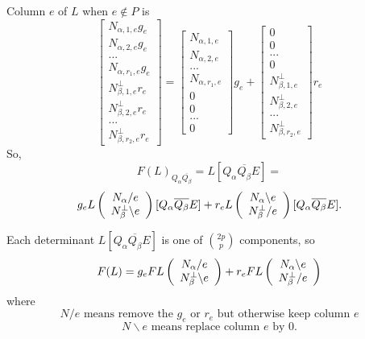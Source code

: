 \documentclass{beamer}
\begin{document}
\begin{frame}
  Column $e$ of $L$ when $e\not\in P$ is
\[
\left[\begin{array}{c}
    N_{\alpha,1,e}g_e\\
    N_{\alpha,2,e}g_e\\
    ...\\
    N_{\alpha,r_1,e}g_e\\
    N_{\beta,1,e}^\perp r_e\\
    N_{\beta,2,e}^\perp r_e\\
    ...\\
    N_{\beta,r_2,e}^\perp r_e
  \end{array}\right]
=
\left[\begin{array}{c}
    N_{\alpha,1,e}\\
    N_{\alpha,2,e}\\
    ...\\
    N_{\alpha,r_1,e}\\
    0\\
    0\\
    ...\\
    0
  \end{array}\right]g_e
+
\left[\begin{array}{c}
    0\\
    0\\
    ...\\
    0\\
    N_{\beta,1,e}^\perp \\
    N_{\beta,2,e}^\perp\\
    ...\\
    N_{\beta,r_2,e}^\perp
  \end{array}\right]r_e
\]
So, 
\[
F(L)_{Q_\alpha \overline{Q_\beta} } = L[Q_\alpha \overline{Q_\beta} E ] =
\]
\[
g_eL\left(\begin{array}{c} N_{\alpha}/e\\ N_{\beta}^{\perp}\backslash e \end{array} \right)[Q_\alpha \overline{Q_\beta} E]
+
r_eL\left(\begin{array}{c} N_{\alpha}\backslash e\\ N_{\beta}^{\perp}/e \end{array} \right)[Q_\alpha \overline{Q_\beta} E].
\]
\end{frame}

\begin{frame}
  Each determinant $L[Q_\alpha \overline{Q_\beta} E]$ is one of $\binom{2p}{p}$ components, so
  \[
  F(L) =
  g_eFL\left(\begin{array}{c} N_{\alpha}/e\\ N_{\beta}^{\perp}\backslash e \end{array} \right)
+
r_eFL\left(\begin{array}{c} N_{\alpha}\backslash e\\ N_{\beta}^{\perp}/e \end{array} \right)
\]
where
\[
N/e \text{\ means remove the\ } g_e \text{\ or\ } r_e \text{\ but otherwise keep column\ }e
\]
\[
N\backslash e \text{\ means replace column\ }e\text{\ by\ }0.
\]
\end{frame}
\end{document}
